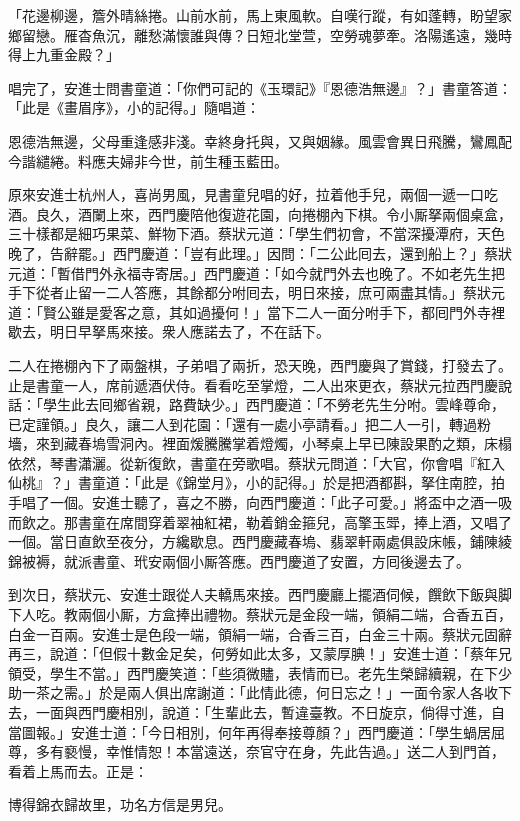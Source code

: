 \begin{myquote} 
「花邊柳邊，簷外晴絲捲。山前水前，馬上東風軟。自嘆行蹤，有如蓬轉，盼望家鄉留戀。雁杳魚沉，離愁滿懷誰與傳？日短北堂萱，空勞魂夢牽。洛陽遙遠，幾時得上九重金殿？」
\end{myquote} 

唱完了，安進士問書童道：「你們可記的《玉環記》『恩德浩無邊』？」書童答道：「此是《畫眉序》，小的記得。」隨唱道：

\begin{myquote}
恩德浩無邊，父母重逢感非淺。幸終身托與，又與姻緣。風雲會異日飛騰，鸞鳳配今諧繾綣。料應夫婦非今世，前生種玉藍田。
\end{myquote}

原來安進士杭州人，喜尚男風，見書童兒唱的好，拉着他手兒，兩個一遞一口吃酒。良久，酒闌上來，西門慶陪他復遊花園，向捲棚內下棋。令小厮拏兩個桌盒，三十樣都是細巧果菜、鮮物下酒。蔡狀元道：「學生們初會，不當深擾潭府，天色晚了，告辭罷。」西門慶道：「豈有此理。」因問：「二公此囘去，還到船上？」蔡狀元道：「暫借門外永福寺寄居。」西門慶道：「如今就門外去也晚了。不如老先生把手下從者止留一二人答應，其餘都分咐囘去，明日來接，庶可兩盡其情。」蔡狀元道：「賢公雖是愛客之意，其如過擾何！」當下二人一面分咐手下，都囘門外寺裡歇去，明日早拏馬來接。衆人應諾去了，不在話下。

二人在捲棚內下了兩盤棋，子弟唱了兩折，恐天晚，西門慶與了賞錢，打發去了。止是書童一人，席前遞酒伏侍。看看吃至掌燈，二人出來更衣，蔡狀元拉西門慶說話：「學生此去囘鄉省親，路費缺少。」西門慶道：「不勞老先生分咐。雲峰尊命，已定謹領。」良久，讓二人到花園：「還有一處小亭請看。」把二人一引，轉過粉墻，來到藏春塢雪洞內。裡面煖騰騰掌着燈燭，小琴桌上早已陳設果酌之類，床榻依然，琴書瀟灑。從新復飲，書童在旁歌唱。蔡狀元問道：「大官，你會唱『紅入仙桃』？」書童道：「此是《錦堂月》，小的記得。」於是把酒都斟，拏住南腔，拍手唱了一個。安進士聽了，喜之不勝，向西門慶道：「此子可愛。」將盃中之酒一吸而飲之。那書童在席間穿着翠袖紅裙，勒着銷金箍兒，高擎玉斝，捧上酒，又唱了一個。當日直飲至夜分，方纔歇息。西門慶藏春塢、翡翠軒兩處俱設床帳，鋪陳綾錦被褥，就派書童、玳安兩個小厮答應。西門慶道了安置，方囘後邊去了。

到次日，蔡狀元、安進士跟從人夫轎馬來接。西門慶廳上擺酒伺候，饌飲下飯與脚下人吃。教兩個小厮，方盒捧出禮物。蔡狀元是金段一端，領絹二端，合香五百，白金一百兩。安進士是色段一端，領絹一端，合香三百，白金三十兩。蔡狀元固辭再三，說道：「但假十數金足矣，何勞如此太多，又蒙厚腆！」安進士道：「蔡年兄領受，學生不當。」西門慶笑道：「些須微贐，表情而已。老先生榮歸續親，在下少助一茶之需。」於是兩人俱出席謝道：「此情此德，何日忘之！」一面令家人各收下去，一面與西門慶相別，說道：「生輩此去，暫違臺教。不日旋京，倘得寸進，自當圖報。」安進士道：「今日相別，何年再得奉接尊顏？」西門慶道：「學生蝸居屈尊，多有褻慢，幸惟情恕！本當遠送，奈官守在身，先此告過。」送二人到門首，看着上馬而去。正是：

\begin{myquote}
博得錦衣歸故里，功名方信是男兒。
\end{myquote}

